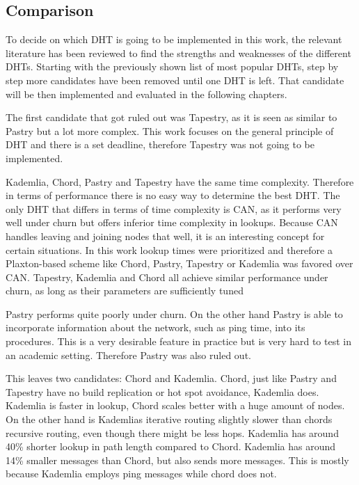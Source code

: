 \documentclass[a4paper, 12pt]{article} %
\begin{document}
\subsection{Comparison}

To decide on which DHT is going to be implemented in this work, the relevant literature has been reviewed to find the strengths and weaknesses of the different DHTs. Starting with the previously shown list of most popular DHTs, step by step more candidates have been removed until one DHT is left. That candidate will be then implemented and evaluated in the following chapters.

The first candidate that got ruled out was Tapestry, as it is seen as similar to Pastry but a lot more complex\cite{Rowstron2001}. This work focuses on the general principle of DHT and there is a set deadline, therefore Tapestry was not going to be implemented.

Kademlia, Chord, Pastry and Tapestry have the same time complexity\cite{Tiendrebeogo2012}. Therefore in terms of performance there is no easy way to determine the best DHT. The only DHT that differs in terms of time complexity is CAN, as it performs very well under churn but offers inferior time complexity in lookups\cite{Lua05asurvey}. Because CAN handles leaving and joining nodes that well, it is an interesting concept for certain situations. In this work lookup times were prioritized and therefore a Plaxton-based scheme like Chord, Pastry, Tapestry or Kademlia was favored over CAN. Tapestry, Kademlia and Chord all achieve similar performance under churn, as long as their parameters are sufficiently tuned\cite{Li04comparingthe}

Pastry performs quite poorly under churn\cite{Lua05asurvey}. On the other hand Pastry is able to incorporate information about the network, such as ping time, into its procedures\cite{naqvi_2017}. This is a very desirable feature in practice but is very hard to test in an academic setting. Therefore Pastry was also ruled out.

This leaves two candidates: Chord and Kademlia. Chord, just like Pastry and Tapestry have no build replication or hot spot avoidance\cite{Lua05asurvey}, Kademlia does. Kademlia is faster in lookup, Chord scales better with a huge amount of nodes\cite{Harjula2011}. On the other hand is Kademlias iterative routing slightly slower than chords recursive routing, even though there might be less hops\cite{Li04comparingthe}. Kademlia has around 40\% shorter lookup in path length compared to Chord\cite{Harjula2011}. Kademlia has around 14\% smaller messages than Chord, but also sends more messages\cite{Harjula2011}. This is mostly because Kademlia employs ping messages while chord does not.
\end{document}
